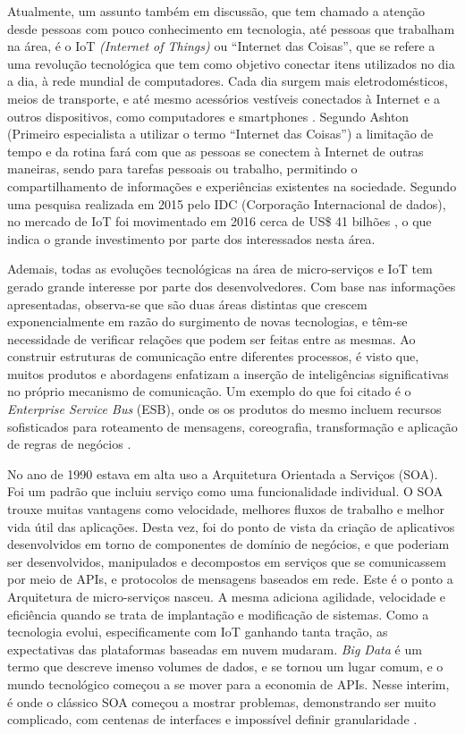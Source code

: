 \documentclass[journal]{IEEEtran}
\begin{document}
Atualmente, um assunto também em discussão, que tem chamado a atenção desde pessoas com pouco conhecimento em tecnologia, até pessoas que trabalham na área, é o IoT \emph{(Internet of Things)} ou “Internet das Coisas”, que se refere a uma revolução tecnológica que tem como objetivo conectar itens utilizados no dia a dia, à rede mundial de computadores. Cada dia surgem mais eletrodomésticos, meios de transporte, e até mesmo acessórios vestíveis conectados à Internet e a outros dispositivos, como computadores e smartphones \cite{PedroZambarda}. Segundo Ashton (Primeiro especialista a utilizar o termo “Internet das Coisas”) \cite{Finep} a limitação de tempo e da rotina fará com que as pessoas se conectem à Internet de outras maneiras, sendo para tarefas pessoais ou trabalho, permitindo o compartilhamento de informações e experiências existentes na sociedade. Segundo uma pesquisa realizada em 2015 pelo IDC (Corporação Internacional de dados), no mercado de IoT foi movimentado em 2016 cerca de US\$ 41 bilhões \cite{idc2017}, o que indica o grande investimento por parte dos interessados nesta área. 

Ademais, todas as evoluções tecnológicas na área de micro-serviços e IoT tem gerado grande interesse por parte dos desenvolvedores. Com base nas informações apresentadas, observa-se que são duas áreas distintas que crescem exponencialmente em razão do surgimento de novas tecnologias, e têm-se necessidade de verificar relações que podem ser feitas entre as mesmas. Ao construir estruturas de comunicação entre diferentes processos, é visto que, muitos produtos e abordagens enfatizam a inserção de inteligências significativas no próprio mecanismo de comunicação. Um exemplo do que foi citado é o \emph{Enterprise Service Bus} (ESB), onde os os produtos do mesmo incluem recursos sofisticados para roteamento de mensagens, coreografia, transformação e aplicação de regras de negócios \cite{martinfowleretal}. 

No ano de 1990 estava em alta uso a Arquitetura Orientada a Serviços (SOA). Foi um padrão que incluiu serviço como uma funcionalidade individual. O SOA trouxe muitas vantagens como velocidade, melhores fluxos de trabalho e melhor vida útil das aplicações. Desta vez, foi do ponto de vista da criação de aplicativos desenvolvidos em torno de componentes de domínio de negócios, e que poderiam ser desenvolvidos, manipulados e decompostos em serviços que se comunicassem por meio de APIs, e protocolos de mensagens baseados em rede. Este é o ponto a Arquitetura de micro-serviços nasceu. A mesma adiciona agilidade, velocidade e eficiência quando se trata de implantação e modificação de sistemas. Como a tecnologia evolui, especificamente com IoT ganhando tanta tração, as expectativas das plataformas baseadas em nuvem mudaram. \emph{Big Data} é um termo que descreve imenso volumes de dados, e se tornou um lugar comum, e o mundo tecnológico começou a se mover para a economia de APIs. Nesse interim, é onde o clássico SOA começou a mostrar problemas, demonstrando ser muito complicado, com centenas de interfaces e impossível definir granularidade \cite{manutayal2016}.
\end{document}
